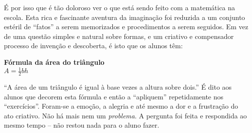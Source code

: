 \documentclass[a4paper,oneside,12pt,notitlepage]{article}
\begin{document}
É por isso que é tão doloroso ver o que está sendo feito com a matemática na escola.
Esta rica e fascinante aventura da imaginação foi reduzida a um conjunto estéril de ``fatos'' a serem memorizados e procedimentos a serem seguidos.
Em vez de uma questão simples e natural sobre formas, e um criativo e compensador processo de invenção e descoberta, é isto que os alunos têm:

\begin{center}
 \textbf{Fórmula da área do triângulo}\\
$A=\frac12 b h$
\end{center}

``A área de um triângulo é igual à base vezes a altura sobre dois.''
É dito aos alunos que decorem esta fórmula e então a ``apliquem'' repetidamente nos ``exercícios''.
Foram-se a emoção, a alegria e até mesmo a dor e a frustração do ato criativo.
Não há mais nem um \textsl{problema}.
A pergunta foi feita e respondida ao mesmo tempo -- não restou nada para o aluno fazer.

\end{document}
